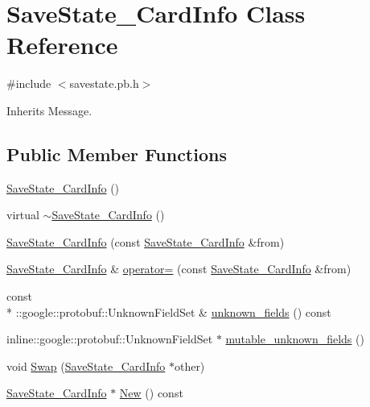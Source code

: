 \hypertarget{class_save_state___card_info}{\section{Save\-State\-\_\-\-Card\-Info Class Reference}
\label{class_save_state___card_info}
}


{\ttfamily \#include $<$savestate.\-pb.\-h$>$}



Inherits Message.

\subsection*{Public Member Functions}
\begin{DoxyCompactItemize}
\item 
\hyperlink{class_save_state___card_info_a9e174ab127c821a6140a8fbc1af441e6}{Save\-State\-\_\-\-Card\-Info} ()
\item 
virtual \hyperlink{class_save_state___card_info_ac00baaa5f08f3770153e3d8f870e317a}{$\sim$\-Save\-State\-\_\-\-Card\-Info} ()
\item 
\hyperlink{class_save_state___card_info_a858df109d10736f299190e3f5ddf28cc}{Save\-State\-\_\-\-Card\-Info} (const \hyperlink{class_save_state___card_info}{Save\-State\-\_\-\-Card\-Info} \&from)
\item 
\hyperlink{class_save_state___card_info}{Save\-State\-\_\-\-Card\-Info} \& \hyperlink{class_save_state___card_info_ab2ba10b390ce682b05f78d54a1c1c098}{operator=} (const \hyperlink{class_save_state___card_info}{Save\-State\-\_\-\-Card\-Info} \&from)
\item 
const \\*
\-::google\-::protobuf\-::\-Unknown\-Field\-Set \& \hyperlink{class_save_state___card_info_a168eee420ea3467ea9652c5d906c6a0c}{unknown\-\_\-fields} () const 
\item 
inline\-::google\-::protobuf\-::\-Unknown\-Field\-Set $\ast$ \hyperlink{class_save_state___card_info_ac72493ca84a6df16d08743ba5d77fb04}{mutable\-\_\-unknown\-\_\-fields} ()
\item 
void \hyperlink{class_save_state___card_info_a6c3dadb06ef3832e84ee05f9751408ad}{Swap} (\hyperlink{class_save_state___card_info}{Save\-State\-\_\-\-Card\-Info} $\ast$other)
\item 
\hyperlink{class_save_state___card_info}{Save\-State\-\_\-\-Card\-Info} $\ast$ \hyperlink{class_save_state___card_info_ab6657a5076af9c6675793dd1d08dd7fa}{New} () const 

\end{DoxyCompactItemize}
